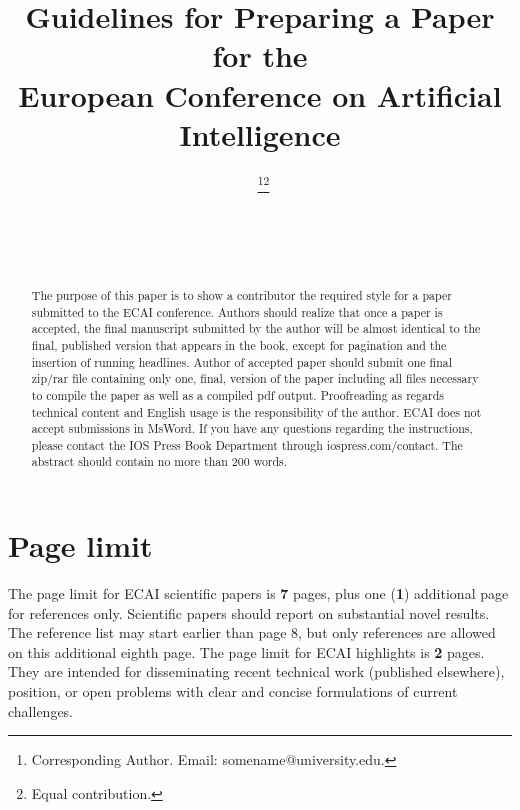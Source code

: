 \documentclass{ecai}  %
\begin{document}
\begin{frontmatter}

\title{Guidelines for Preparing a Paper for the \\
European Conference on Artificial Intelligence}

\author[A]{~\thanks{Corresponding Author. Email: somename@university.edu.}\footnote{Equal contribution.}}
\author[B]{~\footnotemark}
\author[B,C]{~} %


\address[A]{Short Affiliation of First Author}
\address[B]{Short Affiliation of Second Author and Third Author}
\address[C]{Short Affiliation of Third Author}

\begin{abstract}
The purpose of this paper is to show a contributor the required style for a paper submitted to the ECAI conference.
Authors should realize that once a paper is accepted, the final manuscript submitted by the author will be almost
identical to the final, published version that appears in the book, except for pagination and the insertion of running headlines.
Author of accepted paper should submit one final zip/rar file containing only one, final, version of the paper
including all files necessary to compile the paper as well as a compiled pdf output. Proofreading as regards
technical content and English usage is the responsibility of the author. ECAI does not accept submissions in MsWord.
If you have any questions regarding the instructions, please contact the IOS Press Book Department through iospress.com/contact.
The abstract should contain no more than 200 words.
\end{abstract}

\end{frontmatter}

\section{Page limit}
%

The page limit for ECAI scientific papers is {\bf 7} pages, plus one ({\bf 1})
additional page for references only. Scientific papers should report on substantial novel results. The reference list may start earlier than page 8, but only references are allowed on this additional eighth page.
The page limit for ECAI highlights is {\bf 2} pages. They are intended for disseminating  recent technical work (published elsewhere), position, or open problems with clear and concise formulations of current challenges.
\end{document}
